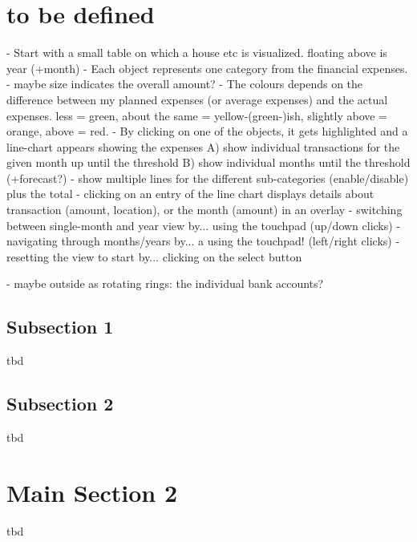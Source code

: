 
\section{to be defined}



- Start with a small table on which a house etc is visualized. floating above is year (+month)
- Each object represents one category from the financial expenses.
- maybe size indicates the overall amount?
- The colours depends on the difference between my planned expenses (or average expenses) and the actual expenses. less = green, about the same = yellow-(green-)ish, slightly above = orange, above = red.
- By clicking on one of the objects, it gets highlighted and a line-chart appears showing the expenses
A) show individual transactions for the given month up until the threshold
B) show individual months until the threshold (+forecast?)
- show multiple lines for the different sub-categories (enable/disable) plus the total
- clicking on an entry of the line chart displays details about transaction (amount, location), or the month (amount) in an overlay
- switching between single-month and year view by... using the touchpad (up/down clicks)
- navigating through months/years by... a using the touchpad! (left/right clicks)
- resetting the view to start by... clicking on the select button

- maybe outside as rotating rings: the individual bank accounts?




\subsection{Subsection 1}

tbd



\subsection{Subsection 2}

tbd



\section{Main Section 2}

tbd